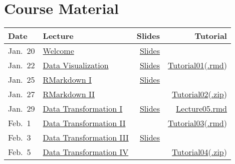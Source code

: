 \documentclass[
]{article}
\begin{document}
\hypertarget{course-material}{%
\section{\texorpdfstring{\textbf{Course
Material}}{Course Material}}\label{course-material}}

\begin{longtable}[]{@{}llrr@{}}
\toprule
Date & Lecture & Slides & Tutorial\tabularnewline
\midrule
\endhead
Jan.~20 &
\href{https://uncch.hosted.panopto.com/Panopto/Pages/Viewer.aspx?id=a47a655b-4f19-4053-8b1f-acb600e76603}{Welcome}
& \href{Lecture/Lecture01/Lecture\%2001\%20Welcome.pdf}{Slides}
&\tabularnewline
Jan.~22 &
\href{https://uncch.hosted.panopto.com/Panopto/Pages/Viewer.aspx?id=07f214c4-0df4-459c-ae76-acb800ed8061}{Data
Visualization} &
\href{Lecture/Lecture02/Lecture\%2002\%20Data_Visualization_Lecture.pdf}{Slides}
&
\href{Tutorial/Tutorial01.html}{Tutorial01}(\href{https://drive.google.com/file/d/1axwnhheH0IMH3xkE_GJWSREK7gdzMLvd/view?usp=sharing}{.rmd})\tabularnewline
Jan.~25 &
\href{https://uncch.hosted.panopto.com/Panopto/Pages/Viewer.aspx?id=3e6fea7d-a17e-4f2c-83c5-acbb00e97185}{RMarkdown
I} &
\href{Lecture/Lecture03/Lecture\%2003\%20Workflow_Lecture.pdf}{Slides}
&\tabularnewline
Jan.~27 &
\href{https://uncch.hosted.panopto.com/Panopto/Pages/Viewer.aspx?id=0e2c6115-9347-46c0-a15f-acbd00ead6c6}{RMarkdown
II} & &
\href{Tutorial/Tutorial02-sol.html}{Tutorial02}(\href{https://drive.google.com/file/d/1DpCkW9N_BdJU0zc1W2J5rMK-MByrTQFZ/view?usp=sharing}{.zip})\tabularnewline
Jan.~29 &
\href{https://uncch.hosted.panopto.com/Panopto/Pages/Viewer.aspx?id=56533c15-32f6-49d3-ba99-acbf00e95196}{Data
Transformation I} &
\href{Lecture/Lecture05/Lecture\%2005\%20Data_Transformation.pdf}{Slides}
&
\href{https://drive.google.com/file/d/1QJLG8MQj2ncr4wGkiZL0CHlX2x9wZemo/view?usp=sharing}{Lecture05.rmd}\tabularnewline
Feb.~1 &
\href{https://uncch.hosted.panopto.com/Panopto/Pages/Viewer.aspx?id=78f334ee-2e31-45bc-a03d-acc200e77db8}{Data
Transformation II} & &
\href{Tutorial/Tutorial03_sol.html}{Tutorial03}(\href{https://drive.google.com/file/d/1zPZpvvshqarahO7qJNqTiX3SCXk-azK5/view?usp=sharing}{.rmd})\tabularnewline
Feb.~3 &
\href{https://uncch.hosted.panopto.com/Panopto/Pages/Viewer.aspx?id=ffdb6c72-8e96-4fa9-a391-acc400ee0c79}{Data
Transformation III} &
\href{Lecture/Lecture07/Lecture\%2007\%20Data_Transformation.pdf}{Slides}
&\tabularnewline
Feb.~5 &
\href{https://uncch.hosted.panopto.com/Panopto/Pages/Viewer.aspx?id=b3b327d3-7e82-4ed9-884d-acc600f0c63f}{Data
Transformation IV} & &
\href{Tutorial/Tutorial04.html}{Tutorial04}(\href{https://drive.google.com/file/d/1UEt-RVM4qAI889eXr_xphXL1M3wbQeqS/view?usp=sharing}{.zip})\tabularnewline

\end{longtable}
\end{document}
